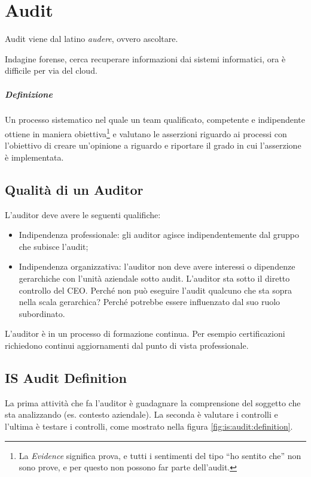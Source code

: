 \chapter{Audit}
\label{audit}

Audit viene dal latino \textit{audere}, ovvero ascoltare.

Indagine forense, cerca recuperare informazioni dai sistemi informatici, ora è 
difficile per via del cloud.

\paragraph*{Definizione}

Un processo sistematico nel quale un team qualificato, competente e 
indipendente 
ottiene in maniera obiettiva\footnote{La \textit{Evidence} significa prova, e 
tutti i sentimenti del tipo ``ho sentito che'' non sono prove, e per questo non 
possono far parte dell'audit.} e valutano le asserzioni riguardo ai processi 
con l'obiettivo di creare un'opinione a riguardo e riportare il grado in cui 
l'asserzione è implementata.


\section{Qualità di un Auditor}

L'auditor deve avere le seguenti qualifiche:
\begin{itemize}
\item Indipendenza professionale: gli auditor agisce indipendentemente dal 
gruppo che subisce l'audit;
\item Indipendenza organizzativa: l'auditor non deve avere interessi o dipendenze 
gerarchiche con l'unità aziendale sotto audit. L'auditor sta sotto il diretto 
controllo del CEO. Perché non può eseguire l'audit qualcuno che sta sopra nella 
scala gerarchica? Perché potrebbe essere influenzato dal suo ruolo subordinato.
\end{itemize}

L'auditor è in un processo di formazione continua. Per esempio certificazioni 
richiedono continui aggiornamenti dal punto di vista professionale.

\section{IS Audit Definition}

La prima attività che fa l'auditor è guadagnare la comprensione del soggetto 
che sta analizzando (es. contesto aziendale).
La seconda è valutare i controlli e l'ultima è testare i controlli, come 
mostrato nella figura \ref{fig:is:audit:definition}.

